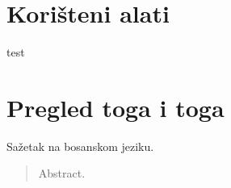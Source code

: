 \documentclass[times, utf8, seminar]{fit}
\begin{document}
\chapter{Korišteni alati}

test

\chapter{Pregled toga i toga}

\begin{sazetak}
Sažetak na bosanskom jeziku.

\end{sazetak}

\begin{abstract}
Abstract.

\end{abstract}
\end{document}
